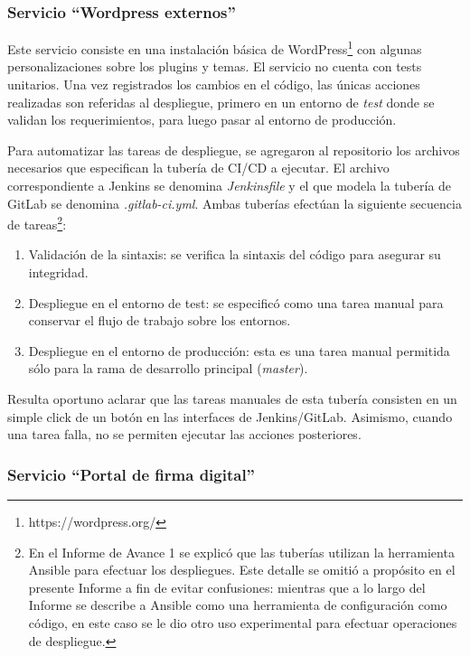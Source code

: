 \subsubsection{Servicio “Wordpress externos”}

Este servicio consiste en una instalación básica de WordPress\footnote{ https://wordpress.org/} con algunas personalizaciones sobre los plugins y temas. El servicio no cuenta con tests unitarios. Una vez registrados los cambios en el código, las únicas acciones realizadas son referidas al despliegue, primero en un entorno de \textit{test} donde se validan los requerimientos, para luego pasar al entorno de producción.

Para automatizar las tareas de despliegue, se agregaron al repositorio los archivos necesarios que especifican la tubería de CI/CD a ejecutar. El archivo correspondiente a Jenkins se denomina \textit{Jenkinsfile} y el que modela la tubería de GitLab se denomina \textit{.gitlab-ci.yml}. Ambas tuberías efectúan la siguiente secuencia de tareas\footnote{ En el Informe de Avance 1 se explicó que las tuberías utilizan la herramienta Ansible para efectuar los despliegues. Este detalle se omitió a propósito en el presente Informe a fin de evitar confusiones: mientras que a lo largo del Informe se describe a Ansible como una herramienta de configuración como código, en este caso se le dio otro uso experimental para efectuar operaciones de despliegue.}:

\begin{enumerate}
\item Validación de la sintaxis: se verifica la sintaxis del código para asegurar su integridad.
\item Despliegue en el entorno de test: se especificó como una tarea manual para conservar el flujo de trabajo sobre los entornos.
\item Despliegue en el entorno de producción: esta es una tarea manual permitida sólo para la rama de desarrollo principal (\textit{master}).
\end{enumerate}
Resulta oportuno aclarar que las tareas manuales de esta tubería consisten en un simple click de un botón en las interfaces de Jenkins/GitLab. Asimismo, cuando una tarea falla, no se permiten ejecutar las acciones posteriores.

\subsubsection{Servicio “Portal de firma digital”}

